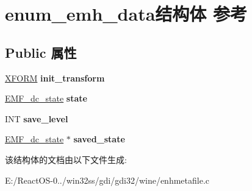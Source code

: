 \hypertarget{structenum__emh__data}{}\section{enum\+\_\+emh\+\_\+data结构体 参考}
\label{structenum__emh__data}
\subsection*{Public 属性}
\begin{DoxyCompactItemize}
\item 
\mbox{\label{structenum__emh__data_a03a7b8efd0ae7493c7f84f173528b91b}} 
\hyperlink{struct___x_f_o_r_m}{X\+F\+O\+RM} {\bfseries init\+\_\+transform}
\item 
\mbox{\label{structenum__emh__data_ab7a5ce90f23032b13fe413af4b2ed2e6}} 
\hyperlink{struct_e_m_f__dc__state}{E\+M\+F\+\_\+dc\+\_\+state} {\bfseries state}
\item 
\mbox{\label{structenum__emh__data_ad6971fa547f94d1f686ebe1564145e37}} 
I\+NT {\bfseries save\+\_\+level}
\item 
\mbox{\label{structenum__emh__data_a10a6794073c0f6983fb4730ae1932651}} 
\hyperlink{struct_e_m_f__dc__state}{E\+M\+F\+\_\+dc\+\_\+state} $\ast$ {\bfseries saved\+\_\+state}
\end{DoxyCompactItemize}


该结构体的文档由以下文件生成\+:\begin{DoxyCompactItemize}
\item 
E\+:/\+React\+O\+S-\/0../win32ss/gdi/gdi32/wine/enhmetafile.\+c\end{DoxyCompactItemize}
